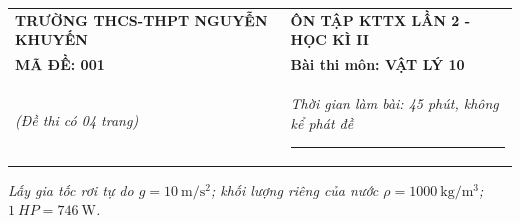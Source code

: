 \begin{center}
	\begin{tabular}{M{9.25cm}M{8.75cm}}
		\textbf{TRƯỜNG THCS-THPT NGUYỄN KHUYẾN}& \textbf{ÔN TẬP KTTX LẦN 2 - HỌC KÌ II}\\
		\textbf{MÃ ĐỀ: 001}& \textbf{Bài thi môn: VẬT LÝ 10}\\
		\textit{(Đề thi có 04 trang)}& \textit{Thời gian làm bài: 45 phút, không kể phát đề}
		
		\noindent\rule{4cm}{0.8pt} \\
	\end{tabular}
\end{center}
\begin{center}
	\textit{Lấy gia tốc rơi tự do $g=\SI{10}{\meter/\second^2}$; khối lượng riêng của nước $\rho=\SI{1000}{\kilogram/\meter^3}$; $\SI{1}{HP}=\SI{746}{\watt}$.}
\end{center}
\setcounter{section}{0}
